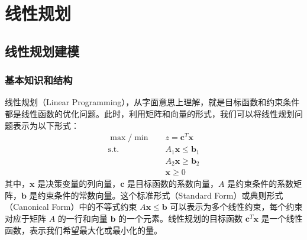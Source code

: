 \documentclass[12pt]{article}
\theoremstyle{plain}
\theoremstyle{definition}
\newcommand{\st}{\mathrel{\text{s.t.}}}
\begin{document}
\section{线性规划}\label{sec:linear_programming}

\subsection{线性规划建模}\label{subsec:lp_modeling}

\subsubsection{基本知识和结构}\label{subsubsec:basics}

线性规划（Linear Programming），从字面意思上理解，就是目标函数和约束条件都是线性函数的优化问题。此时，利用矩阵和向量的形式，我们可以将线性规划问题表示为以下形式：
\begin{align*}
    \max/\min \quad & z = \bm{c}^T \bm{x} \\
    \st \quad & A_1\bm{x} \leq \bm{b}_1 \\
    & A_2\bm{x} \geq \bm{b}_2 \\
    & \bm{x} \geq 0
\end{align*}
其中，$\bm{x}$ 是决策变量的列向量，$\bm{c}$ 是目标函数的系数向量，$A$ 是约束条件的系数矩阵，$\bm{b}$ 是约束条件的常数向量。这个标准形式（Standard Form）或典则形式（Canonical Form）中的不等式约束 $A\bm{x} \leq \bm{b}$ 可以表示为多个线性约束，每个约束对应于矩阵 $A$ 的一行和向量 $\bm{b}$ 的一个元素。线性规划的目标函数 $\bm{c}^T \bm{x}$ 是一个线性函数，表示我们希望最大化或最小化的量。
\end{document}

